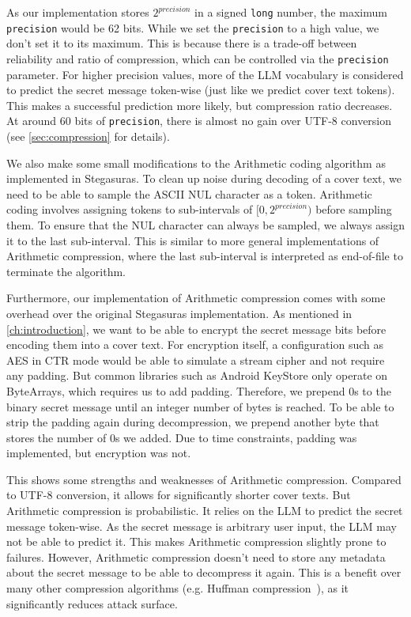 As our implementation stores $2^{precision}$ in a signed \lstinline|long| number, the maximum \lstinline|precision| would be 62 bits. While we set the \lstinline|precision| to a high value, we don't set it to its maximum. This is because there is a trade-off between reliability and ratio of compression, which can be controlled via the \lstinline|precision| parameter. For higher precision values, more of the \gls{LLM} vocabulary is considered to predict the secret message token-wise (just like we predict cover text tokens). This makes a successful prediction more likely, but compression ratio decreases. At around 60 bits of \lstinline|precision|, there is almost no gain over UTF-8 conversion (see \cref{sec:compression} for details).

We also make some small modifications to the Arithmetic coding algorithm as implemented in Stegasuras. To clean up noise during decoding of a cover text, we need to be able to sample the ASCII NUL character as a token. Arithmetic coding involves assigning tokens to sub-intervals of $ [0, 2^{precision}) $ before sampling them. To ensure that the NUL character can always be sampled, we always assign it to the last sub-interval. This is similar to more general implementations of Arithmetic compression, where the last sub-interval is interpreted as end-of-file to terminate the algorithm.

Furthermore, our implementation of Arithmetic compression comes with some overhead over the original Stegasuras implementation. As mentioned in \cref{ch:introduction}, we want to be able to encrypt the secret message bits before encoding them into a cover text. For encryption itself, a configuration such as \gls{AES} in \gls{CTR} mode would be able to simulate a stream cipher and not require any padding. But common libraries such as Android KeyStore only operate on ByteArrays, which requires us to add padding. Therefore, we prepend 0s to the binary secret message until an integer number of bytes is reached. To be able to strip the padding again during decompression, we prepend another byte that stores the number of 0s we added. Due to time constraints, padding was implemented, but encryption was not.

This shows some strengths and weaknesses of Arithmetic compression. Compared to UTF-8 conversion, it allows for significantly shorter cover texts. But Arithmetic compression is probabilistic. It relies on the \gls{LLM} to predict the secret message token-wise. As the secret message is arbitrary user input, the \gls{LLM} may not be able to predict it. This makes Arithmetic compression slightly prone to failures. However, Arithmetic compression doesn't need to store any metadata about the secret message to be able to decompress it again. This is a benefit over many other compression algorithms (e.g. Huffman compression~\cite{huffmanMethodConstructionMinimumRedundancy1952}), as it significantly reduces attack surface.

